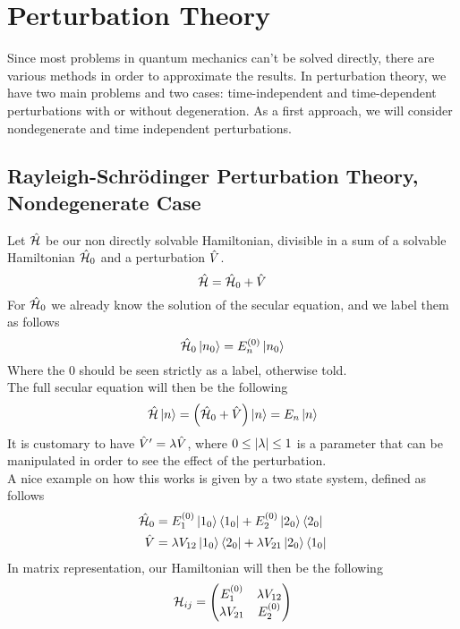 \documentclass[../qm.tex]{subfiles}
\begin{document}
	\section{Perturbation Theory}
	Since most problems in quantum mechanics can't be solved directly, there are various methods in order to approximate the results. In perturbation theory, we have two main problems and two cases: time-independent and time-dependent perturbations with or without degeneration. As a first approach, we will consider nondegenerate and time independent perturbations.
	\subsection{Rayleigh-Schrödinger Perturbation Theory, Nondegenerate Case}
	Let $\hat{\mathcal{H}}$ be our non directly solvable Hamiltonian, divisible in a sum of a solvable Hamiltonian $\hat{\mathcal{H}}_0$ and a perturbation $\hat{V}$.
	\begin{equation}
		\hat{\mathcal{H}}=\hat{\mathcal{H}}_0+\hat{V}
		\label{eq:pertham1}
	\end{equation}
	For $\hat{\mathcal{H}}_0$ we already know the solution of the secular equation, and we label them as follows
	\begin{equation}
		\hat{\mathcal{H}}_0\ket{n_0}=E_n^{(0)}\ket{n_0}
		\label{eq:phsec0}
	\end{equation}
	Where the $0$ should be seen strictly as a label, otherwise told.\\
	The full secular equation will then be the following
	\begin{equation}
		\hat{\mathcal{H}}\ket{n}=\left( \hat{\mathcal{H}}_0+\hat{V} \right)\ket{n}=E_n\ket{n}
		\label{eq:phsec}
	\end{equation}
	It is customary to have $\hat{V}'=\lambda\hat{V}$, where $0\le\abs{\lambda}\le1$ is a parameter that can be manipulated in order to see the effect of the perturbation.\\
	A nice example on how this works is given by a two state system, defined as follows
	\begin{equation}
		\begin{aligned}
			\hat{\mathcal{H}}_0&=E_1^{(0)}\ket{1_0}\bra{1_0}+E_2^{(0)}\ket{2_0}\bra{2_0}\\
			\hat{V}&=\lambda V_{12}\ket{1_0}\bra{2_0}+\lambda V_{21}\ket{2_0}\bra{1_0}
		\end{aligned}
		\label{eq:toytheoryham}
	\end{equation}
	In matrix representation, our Hamiltonian will then be the following
	\begin{equation}
		\mathcal{H}_{ij}=\begin{pmatrix}
			E^{(0)}_1&\lambda V_{12}\\
			\lambda V_{21}&E^{(0)}_2
		\end{pmatrix}
		\label{eq:twolevel}
	\end{equation}
\end{document}

